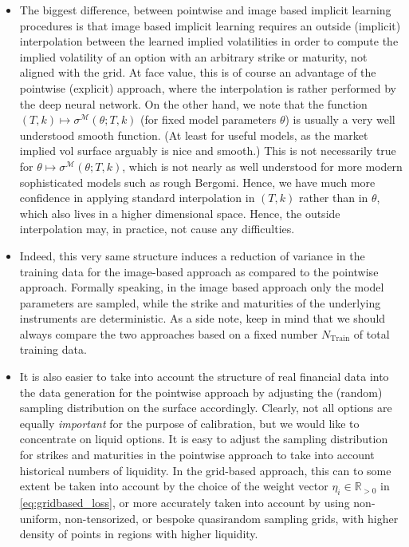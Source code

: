 \documentclass{article}
\theoremstyle{remark}
\begin{document}
\begin{itemize}
\item The biggest difference, between pointwise and image based implicit learning procedures
is  that image based implicit learning requires an outside (implicit) interpolation
between the learned implied volatilities in order to compute the implied
volatility of an option with an arbitrary strike or maturity, not aligned
with the grid. At face value, this is of course an advantage of the
pointwise (explicit) approach, where the interpolation is rather performed by the deep
neural network. On the other hand, we note that the function
$(T,k) \mapsto \sigma^{\mathcal{M}}(\theta; T,k)$ (for fixed model
parameters $\theta$) is usually a very well understood smooth function. (At
least for useful models, as the market implied vol surface arguably is nice
and smooth.) This is not necessarily true for
$\theta \mapsto \sigma^{\mathcal{M}}(\theta; T,k)$, which is not nearly as
well understood for more modern sophisticated models such as rough Bergomi. Hence, we
have much more confidence in applying standard interpolation in $(T,k)$
rather than in $\theta$, which also lives in a higher dimensional
space. Hence, the outside interpolation may, in practice, not cause any
difficulties. 

\item Indeed, this very same structure induces a reduction of variance in the
training data for the image-based approach as compared to the pointwise
approach. Formally speaking, in the image based approach only the
model parameters are sampled, while the strike and maturities of the
underlying instruments are deterministic. As a side note, keep in mind that we
should always compare the two approaches based on a fixed number $N_{\mathrm{Train}}$
of total training data.

\item It is also easier to take into account the structure of real financial data
into the data generation for the pointwise approach by adjusting the (random) sampling distribution on the surface accordingly. Clearly, not all options
are equally \emph{important} for the purpose of calibration, but we would like
to concentrate on liquid options. It is easy to adjust the sampling
distribution for strikes and maturities in the pointwise approach to take into
account historical numbers of liquidity. In the grid-based approach, this can to some extent be taken into account by the choice of the weight vector $\eta_i \in \mathbb{R}_{>0}$ in \eqref{eq:gridbased_loss}, or more accurately taken into account by using non-uniform, non-tensorized, or bespoke quasirandom sampling
grids, with higher density of points in regions with higher liquidity. 


\end{itemize}
\end{document}
